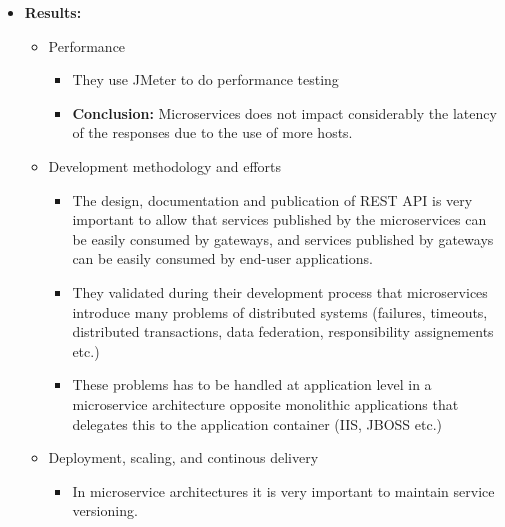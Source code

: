 \begin{itemize}
  \item \textbf{Results:}
  \begin{itemize}
  	\item Performance
  	\begin{itemize}
  		\item They use JMeter to do performance testing
  		\item \textbf{Conclusion:} Microservices does not impact considerably the latency of the responses due to the use of more hosts.
	\end{itemize}
	\item Development methodology and efforts
	\begin{itemize}
  		\item The design, documentation and publication of REST API is very important to allow that services published by the microservices can be easily consumed by gateways, and services published by gateways can be easily consumed by end-user applications.
  		\item They validated during their development process that microservices introduce many problems of distributed systems (failures, timeouts, distributed transactions, data federation, responsibility assignements etc.)
  		\item These problems has to be handled at application level in a microservice architecture opposite monolithic applications that delegates this to the application container (IIS, JBOSS etc.) 
	\end{itemize}
	\item Deployment, scaling, and continous delivery
	\begin{itemize}
  		\item In microservice architectures it is very important to maintain service versioning. 
	\end{itemize}


  \end{itemize}

\end{itemize}
